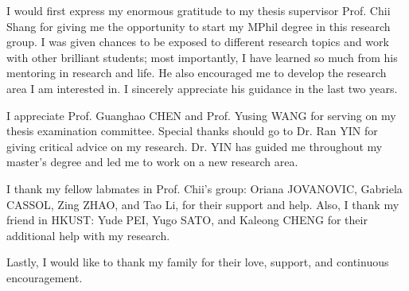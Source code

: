 \acknowledgments

I would first express my enormous gratitude to my thesis supervisor Prof. Chii Shang for giving me the opportunity to start my MPhil degree in this research group. I was given chances to be exposed to different research topics and work with other brilliant students; most importantly, I have learned so much from his mentoring in research and life. He also encouraged me to develop the research area I am interested in. I sincerely appreciate his guidance in the last two years.

I appreciate Prof. Guanghao CHEN and Prof. Yusing WANG for serving on my thesis examination committee. Special thanks should go to Dr. Ran YIN for giving critical advice on my research. Dr. YIN has guided me throughout my master's degree and led me to work on a new research area.

I thank my fellow labmates in Prof. Chii's group: Oriana JOVANOVIC, Gabriela CASSOL, Zing ZHAO, and Tao Li, for their support and help. Also, I thank my friend in HKUST: Yude PEI, Yugo SATO, and Kaleong CHENG for their additional help with my research.

Lastly, I would like to thank my family for their love, support, and continuous encouragement.

\endacknowledgments
 